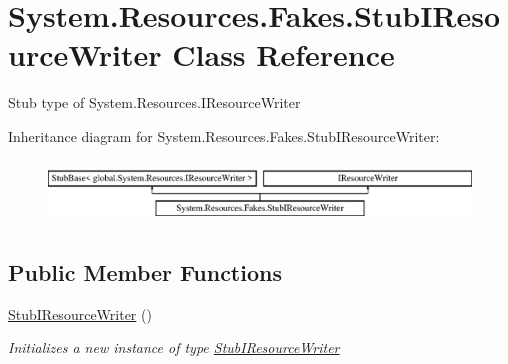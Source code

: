 \hypertarget{class_system_1_1_resources_1_1_fakes_1_1_stub_i_resource_writer}{\section{System.\-Resources.\-Fakes.\-Stub\-I\-Resource\-Writer Class Reference}
\label{class_system_1_1_resources_1_1_fakes_1_1_stub_i_resource_writer}
}


Stub type of System.\-Resources.\-I\-Resource\-Writer 


Inheritance diagram for System.\-Resources.\-Fakes.\-Stub\-I\-Resource\-Writer\-:\begin{figure}[H]
\begin{center}
\leavevmode
\includegraphics[height=1.676647cm]{class_system_1_1_resources_1_1_fakes_1_1_stub_i_resource_writer}
\end{center}
\end{figure}
\subsection*{Public Member Functions}
\begin{DoxyCompactItemize}
\item 
\hyperlink{class_system_1_1_resources_1_1_fakes_1_1_stub_i_resource_writer_a7ec6c76ff3c131c83a2873debfc1e0cf}{Stub\-I\-Resource\-Writer} ()
\begin{DoxyCompactList}\small\item\em Initializes a new instance of type \hyperlink{class_system_1_1_resources_1_1_fakes_1_1_stub_i_resource_writer}{Stub\-I\-Resource\-Writer}\end{DoxyCompactList}\end{DoxyCompactItemize}
